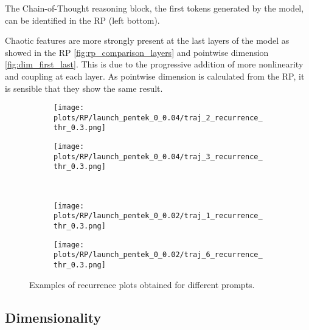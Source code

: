 \documentclass[a4paper,12pt]{article}
\begin{document}
The Chain-of-Thought reasoning block, the first tokens generated by the model, can be identified in the RP (left bottom).

Chaotic features are more strongly present at the last layers of the model as showed in the RP \ref{fig:rp_comparison_layers} and pointwise dimension \ref{fig:dim_first_last}. This is due to the progressive addition of more nonlinearity and coupling at each layer. As pointwise dimension is calculated from the RP, it is sensible that they show the same result.

\begin{figure}[H]
    \centering
    \begin{subfigure}[b]{0.48\textwidth}
        \centering
        \texttt{[image: plots/RP/launch\_pentek\_0\_0.04/traj\_2\_recurrence\_thr\_0.3.png]}
    \end{subfigure}\hfill
    \begin{subfigure}[b]{0.48\textwidth}
        \centering
        \texttt{[image: plots/RP/launch\_pentek\_0\_0.04/traj\_3\_recurrence\_thr\_0.3.png]}
    \end{subfigure}
    \\[0.5em]
    \begin{subfigure}[b]{0.48\textwidth}
        \centering
        \texttt{[image: plots/RP/launch\_pentek\_0\_0.02/traj\_1\_recurrence\_thr\_0.3.png]}
    \end{subfigure}\hfill
    \begin{subfigure}[b]{0.48\textwidth}
        \centering
        \texttt{[image: plots/RP/launch\_pentek\_0\_0.02/traj\_6\_recurrence\_thr\_0.3.png]}
    \end{subfigure}
    \caption{Examples of recurrence plots obtained for different prompts.}
    \label{fig:rp_interesting}
\end{figure}

\subsection{Dimensionality}
\end{document}
